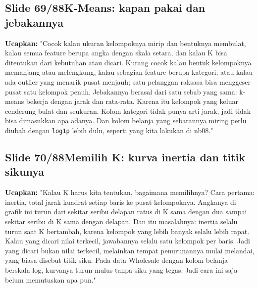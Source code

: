 \documentclass[11pt]{article}
\renewcommand{\framebox}[1]{\colorbox{acc!15}{\textcolor{acc}{\textbf{#1}}}}
\begin{document}
\subsection*{\framebox{Slide 69/88}\quad K-Means: kapan pakai dan jebakannya}
\textbf{Ucapkan:} "Cocok kalau ukuran kelompoknya mirip dan bentuknya membulat, kalau semua feature berupa angka dengan skala setara, dan kalau K bisa ditentukan dari kebutuhan atau dicari. Kurang cocok kalau bentuk kelompoknya memanjang atau melengkung, kalau sebagian feature berupa kategori, atau kalau ada outlier yang menarik pusat menjauh; satu pelanggan raksasa bisa menggeser pusat satu kelompok penuh. Jebakannya berasal dari satu sebab yang sama: k-means bekerja dengan jarak dan rata-rata. Karena itu kelompok yang keluar cenderung bulat dan seukuran. Kolom kategori tidak punya arti jarak, jadi tidak bisa dimasukkan apa adanya. Dan kolom belanja yang sebarannya miring perlu diubah dengan \texttt{log1p} lebih dulu, seperti yang kita lakukan di nb08."\\[2pt]

\subsection*{\framebox{Slide 70/88}\quad Memilih K: kurva inertia dan titik sikunya}
\textbf{Ucapkan:} "Kalau K harus kita tentukan, bagaimana memilihnya? Cara pertama: inertia, total jarak kuadrat setiap baris ke pusat kelompoknya. Angkanya di grafik ini turun dari sekitar seribu delapan ratus di K sama dengan dua sampai sekitar seribu di K sama dengan delapan. Dan itu masalahnya: inertia selalu turun saat K bertambah, karena kelompok yang lebih banyak selalu lebih rapat. Kalau yang dicari nilai terkecil, jawabannya selalu satu kelompok per baris. Jadi yang dicari bukan nilai terkecil, melainkan tempat penurunannya mulai melandai, yang biasa disebut titik siku. Pada data Wholesale dengan kolom belanja berskala log, kurvanya turun mulus tanpa siku yang tegas. Jadi cara ini saja belum memutuskan apa pun."\\[2pt]
\end{document}
